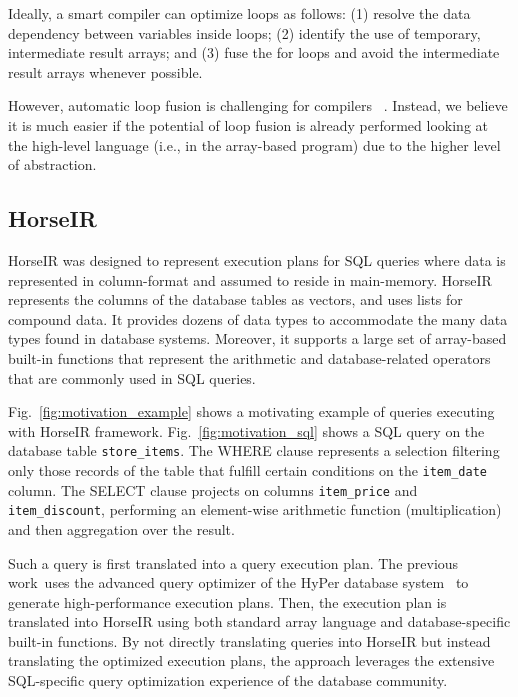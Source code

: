 Ideally, a smart compiler can optimize loops as follows:
(1) resolve the data dependency between variables inside loops;
(2) identify the use of temporary, intermediate result arrays; and
(3) fuse the for loops and avoid the intermediate result arrays whenever possible.


However, automatic loop fusion is challenging for compilers ~\cite{Kennedy01:FastFusion,Kennedy1993:LoopFusion}.
Instead, we believe it is much easier if the potential of loop fusion is already performed looking at the high-level language (i.e., in the array-based program) due to the higher level of abstraction.

\subsection{HorseIR}

HorseIR \OldPaper was designed to represent execution plans for SQL queries where data is represented in column-format and assumed to reside in main-memory. HorseIR represents the columns of the database tables as vectors, and uses lists for compound data. It provides dozens of data types to accommodate the many data types found in database systems. 
Moreover, it supports a large set of array-based built-in functions that represent the arithmetic and database-related operators that are commonly used in SQL queries.

Fig.~\ref{fig:motivation_example} shows a motivating example of queries executing with HorseIR framework. Fig.~\ref{fig:motivation_sql} shows a SQL query on the database table \texttt{store\_items}. The WHERE clause represents a selection filtering only those records of the table that fulfill certain conditions on the \texttt{item_date} column. The SELECT clause projects on columns \texttt{item_price} and \texttt{item\_discount}, performing an element-wise arithmetic function (multiplication) and then aggregation over the result. 



Such a query is first translated into a query execution plan. The previous
work~\OldPaper uses the advanced query optimizer of the HyPer database
system~\cite{Neumann2011:HyPer} to generate high-performance execution plans.
Then, the execution plan is translated into HorseIR using both standard array
language and database-specific built-in functions. By not directly translating
queries into HorseIR but instead translating the optimized execution plans, the
approach leverages the extensive SQL-specific query optimization experience of
the database community.

